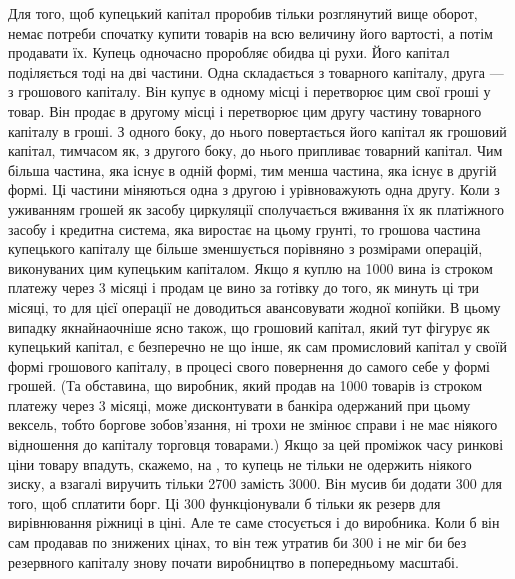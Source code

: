 Для того, щоб купецький капітал проробив тільки розглянутий
вище оборот, немає потреби спочатку купити товарів на
всю величину його вартості, а потім продавати їх. Купець одночасно
проробляє обидва ці рухи. Його капітал поділяється тоді
на дві частини. Одна складається з товарного капіталу, друга —
з грошового капіталу. Він купує в одному місці і перетворює
цим свої гроші у товар. Він продає в другому місці і перетворює
цим другу частину товарного капіталу в гроші. З одного
боку, до нього повертається його капітал як грошовий капітал,
тимчасом як, з другого боку, до нього припливає товарний капітал.
Чим більша частина, яка існує в одній формі, тим менша
частина, яка існує в другій формі. Ці частини міняються одна
з другою і урівноважують одна другу. Коли з уживанням грошей
як засобу циркуляції сполучається вживання їх як платіжного
засобу і кредитна система, яка виростає на цьому грунті, то
грошова частина купецького капіталу ще більше зменшується порівняно
з розмірами операцій, виконуваних цим купецьким капіталом.
Якщо я куплю на 1000 вина із строком
платежу через 3 місяці і продам це вино за готівку до того, як
минуть ці три місяці, то для цієї операції не доводиться авансовувати
жодної копійки. В цьому випадку якнайнаочніше ясно
також, що грошовий капітал, який тут фігурує як купецький
капітал, є безперечно не що інше, як сам промисловий капітал
у своїй формі грошового капіталу, в процесі свого повернення
до самого себе у формі грошей. (Та обставина, що виробник,
який продав на 1000 товарів із строком платежу
через 3 місяці, може дисконтувати в банкіра одержаний при цьому
вексель, тобто боргове зобов’язання, ні трохи не змінює справи
і не має ніякого відношення до капіталу торговця товарами.)
Якщо за цей проміжок часу ринкові ціни товару впадуть,
скажемо, на , то купець не тільки не одержить ніякого
зиску, а взагалі виручить тільки 2700 замість
3000. Він мусив би додати 300
для того, щоб сплатити борг. Ці 300
функціонували б тільки як резерв для вирівнювання ріжниці в
ціні. Але те саме стосується і до виробника. Коли б він сам продавав
по знижених цінах, то він теж утратив би 300
і не міг би без резервного капіталу знову почати виробництво
в попередньому масштабі.

